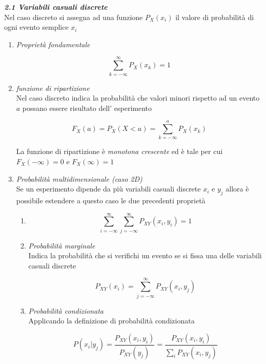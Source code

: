 \documentclass[]{article}
\begin{document}
\textit{\textbf{2.1 Variabili casuali discrete}}
\\

Nel caso discreto si assegna ad una funzione $P_X (x_i)$ il valore di probabilità di ogni evento semplice $x_i$

\begin{enumerate}
\item \textit{Proprietà fondamentale}

\begin{equation}
\sum_{k=- \infty}^{\infty} P_X(x_k)=1
\end{equation}

\item \textit{funzione di ripartizione} \\ 
Nel caso discreto indica la probabilità che valori minori rispetto ad un evento $a$ possano essere risultato dell' esperimento

\begin{equation}
F_X (a)= P_X(X<a)= \sum_{k=-\infty}^{a} P_X(x_k)
\end{equation}

La funzione di ripartizione è \textit{monotona crescente} ed è tale per cui $F_X(- \infty)=0$ e $F_X(\infty)=1$

\item \textit{Probabilità multidimensionale (caso 2D)}\\
Se un esperimento dipende da più variabili casuali discrete $x_i$ e $y_j$ allora è possibile estendere a questo caso le due precedenti proprietà

\begin{enumerate}
\item
\begin{equation}
\sum_{i=- \infty}^{\infty} \sum_{j=- \infty}^{\infty} P_{XY}(x_i,y_i)=1
\end{equation}

\item \textit{Probabilità marginale}
\\ Indica la probabilità che si verifichi un evento se si fissa una delle variabili casuali discrete

\begin{equation}
P_{XY}(x_i)=\sum_{j=- \infty}^{\infty} P_{XY}(x_i,y_j)
\end{equation}

\item \textit{Probabilità condizionata}
\\ Applicando la definizione di probabilità condizionata

\begin{equation}
P(x_i | y_j)= \frac{P_{XY}(x_i,y_i)}{P_{XY}(y_j)}= \frac{P_{XY}(x_i,y_i)}{\sum_i P_{XY}(x_i,y_j)}
\end{equation}

\end{enumerate}

\end{enumerate}
\end{document}
